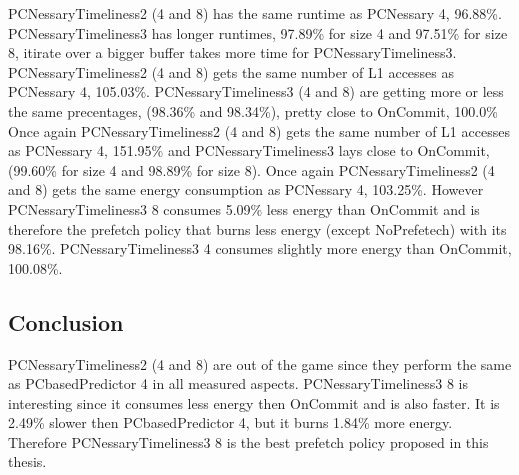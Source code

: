 PCNessaryTimeliness2 (4 and 8) has the same runtime as PCNessary 4, 96.88\%. PCNessaryTimeliness3 has longer runtimes, 97.89\% for size 4 and 97.51\% for size 8, itirate over a bigger buffer takes more time for PCNessaryTimeliness3.
\resAcc
{}
PCNessaryTimeliness2 (4 and 8) gets the same number of L1 accesses as PCNessary 4, 105.03\%. PCNessaryTimeliness3 (4 and 8) are getting more or less the same precentages, (98.36\% and 98.34\%), pretty close to OnCommit, 100.0\%
\resSp
{}
Once again PCNessaryTimeliness2 (4 and 8) gets the same number of L1 accesses as PCNessary 4, 151.95\% and PCNessaryTimeliness3 lays close to OnCommit, (99.60\% for size 4 and 98.89\% for size 8).
\resEnergy
{}
Once again PCNessaryTimeliness2 (4 and 8) gets the same energy consumption as PCNessary 4, 103.25\%. However PCNessaryTimeliness3 8 consumes 5.09\% less energy than OnCommit and is therefore the prefetch policy that burns less energy (except NoPrefetech) with its 98.16\%.     PCNessaryTimeliness3 4 consumes slightly more energy than OnCommit,  100.08\%.
  


\subsection{Conclusion}
PCNessaryTimeliness2 (4 and 8) are out of the game since they perform the same as PCbasedPredictor 4 in all measured aspects. PCNessaryTimeliness3 8 is interesting since it consumes less energy then OnCommit and is also faster. It is 2.49\% slower then PCbasedPredictor 4, but it burns 1.84\% more energy. Therefore PCNessaryTimeliness3 8 is the best prefetch policy proposed in this thesis.